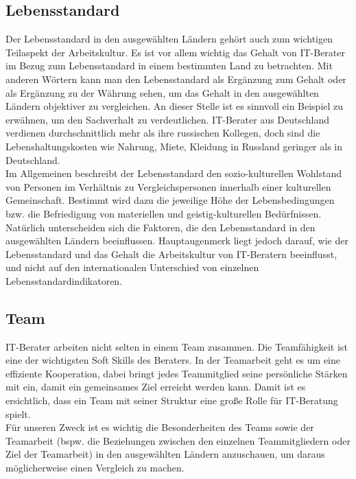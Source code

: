 \subsection*{Lebensstandard}
Der Lebensstandard in den ausgewählten Ländern gehört auch zum wichtigen Teilaspekt der Arbeitskultur. Es ist vor allem wichtig das Gehalt von IT-Berater im Bezug zum Lebensstandard in einem bestimmten Land zu betrachten. Mit anderen Wörtern kann man den Lebensstandard als Ergänzung zum Gehalt oder als Ergänzung zu der Währung sehen, um das Gehalt in den ausgewählten Ländern objektiver zu vergleichen. An dieser Stelle ist es sinnvoll ein Beispiel zu erwähnen, um den Sachverhalt zu verdeutlichen. IT-Berater aus Deutschland verdienen durchschnittlich mehr als ihre russischen Kollegen, doch sind die Lebenshaltungskosten wie Nahrung, Miete, Kleidung in Russland geringer als in Deutschland.\\
Im Allgemeinen beschreibt der Lebensstandard den sozio-kulturellen Wohlstand von Personen im Verhältnis zu Vergleichspersonen innerhalb einer kulturellen Gemeinschaft. Bestimmt wird dazu die jeweilige Höhe der Lebensbedingungen bzw. die Befriedigung von materiellen und geistig-kulturellen Bedürfnissen. \cite{LbsWiki} \\
Natürlich unterscheiden sich die Faktoren, die den Lebensstandard in den ausgewählten Ländern beeinflussen. Hauptaugenmerk liegt jedoch darauf, wie der Lebensstandard und das Gehalt die Arbeitskultur von IT-Beratern beeinflusst, und nicht auf den internationalen Unterschied von einzelnen Lebensstandardindikatoren.
\subsection*{Team}
IT-Berater arbeiten nicht selten in einem Team zusammen. Die Teamfähigkeit ist eine der wichtigsten Soft Skills des Beraters. In der Teamarbeit geht es um eine effiziente Kooperation, dabei bringt jedes Teammitglied seine persönliche Stärken mit ein, damit ein gemeinsames Ziel erreicht werden kann. Damit ist es ersichtlich, dass ein Team mit seiner Struktur eine große Rolle für IT-Beratung spielt.\\
Für unseren Zweck ist es wichtig die Besonderheiten des Teams sowie der Teamarbeit (bspw. die Beziehungen zwischen den einzelnen Teammitgliedern oder Ziel der Teamarbeit) in den ausgewählten Ländern anzuschauen, um daraus möglicherweise einen Vergleich zu machen.

